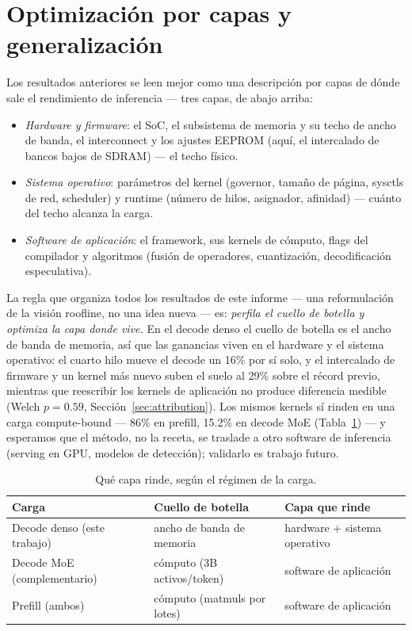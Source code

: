\documentclass[10pt,a4paper]{article}
\begin{document}
\section{Optimización por capas y generalización}
\label{sec:layers}
Los resultados anteriores se leen mejor como una descripción por capas de dónde sale el rendimiento de inferencia --- tres capas, de abajo arriba:
\begin{itemize}
  \item \emph{Hardware y firmware}: el SoC, el subsistema de memoria y su techo de ancho de banda, el interconnect y los ajustes EEPROM (aquí, el intercalado de bancos bajos de SDRAM) --- el techo físico.
  \item \emph{Sistema operativo}: parámetros del kernel (governor, tamaño de página, sysctls de red, scheduler) y runtime (número de hilos, asignador, afinidad) --- cuánto del techo alcanza la carga.
  \item \emph{Software de aplicación}: el framework, sus kernels de cómputo, flags del compilador y algoritmos (fusión de operadores, cuantización, decodificación especulativa).
\end{itemize}

La regla que organiza todos los resultados de este informe --- una reformulación de la visión roofline, no una idea nueva --- es: \emph{perfila el cuello de botella y optimiza la capa donde vive.} En el decode denso el cuello de botella es el ancho de banda de memoria, así que las ganancias viven en el hardware y el sistema operativo: el cuarto hilo mueve el decode un 16\% por sí solo, y el intercalado de firmware y un kernel más nuevo suben el suelo al 29\% sobre el récord previo, mientras que reescribir los kernels de aplicación no produce diferencia medible (Welch $p{=}0.59$, Sección~\ref{sec:attribution}). Los mismos kernels sí rinden en una carga compute-bound --- 86\% en prefill, 15.2\% en decode MoE (Tabla~\ref{tab:layermap}) --- y esperamos que el método, no la receta, se traslade a otro software de inferencia (serving en GPU, modelos de detección); validarlo es trabajo futuro.

\begin{table}[H]
\centering\small
\caption{Qué capa rinde, según el régimen de la carga.}
\label{tab:layermap}
\begin{tabularx}{\textwidth}{p{4.4cm}XX}
\toprule
\textbf{Carga} & \textbf{Cuello de botella} & \textbf{Capa que rinde} \\
\midrule
Decode denso (este trabajo) & ancho de banda de memoria & hardware + sistema operativo \\
Decode MoE (complementario) & cómputo (3B activos/token) & software de aplicación \\
Prefill (ambos) & cómputo (matmuls por lotes) & software de aplicación \\
\bottomrule
\end{tabularx}
\end{table}
\end{document}
